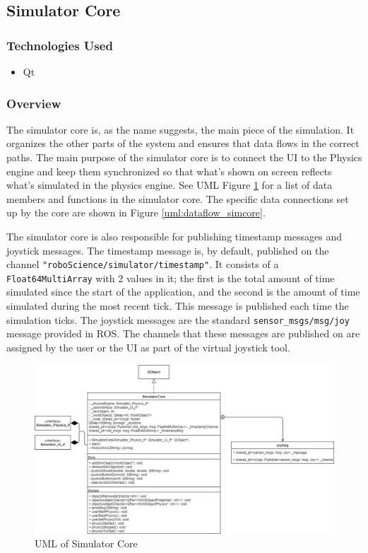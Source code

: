 \subsection{Simulator Core}

\subsubsection*{Technologies Used}
\begin{itemize}
	\item Qt
\end{itemize}

\subsubsection*{Overview}
The simulator core is, as the name suggests, the main piece of the simulation. It organizes the other parts of the system and ensures that data flows in the correct paths. The main purpose of the simulator core is to connect the UI to the Physics engine and keep them synchronized so that what's shown on screen reflects what's simulated in the physics engine. See UML Figure \ref{uml:simcore} for a list of data members and functions in the simulator core. The specific data connections set up by the core are shown in Figure \ref{uml:dataflow_simcore}.

The simulator core is also responsible for publishing timestamp messages and joystick messages. The timestamp message is, by default, published on the channel \lstinline|"roboScience/simulator/timestamp"|. It consists of a \lstinline|Float64MultiArray| with 2 values in it; the first is the total amount of time simulated since the start of the application, and the second is the amount of time simulated during the most recent tick. This message is published each time the simulation ticks. The joystick messages are the standard \lstinline|sensor_msgs/msg/joy| message provided in ROS. The channels that these messages are published on are assigned by the user
or the UI as part of the virtual joystick tool.
 
 \begin{figure}[h]
 	\begin{center}
 	\includegraphics[width=\textwidth]{./images_design/uml/SimCore}
 	\caption{UML of Simulator Core\label{uml:simcore}}
 	\end{center}
 \end{figure}

